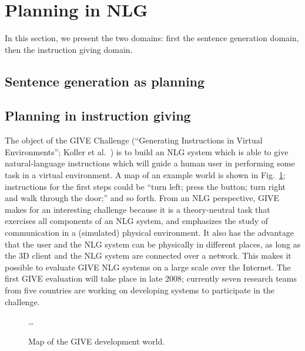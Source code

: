\section{Planning in NLG} \label{sec:domains}

In this section, we present the two domains: first the sentence
generation domain, then the instruction giving domain.


\subsection{Sentence generation as planning}






\subsection{Planning in instruction giving}

The object of the GIVE Challenge (``Generating Instructions in Virtual
Environments''; Koller et al.\
\citeyear{alexander07:_shared_task_propos}) is to build an NLG system
which is able to give natural-language instructions which will guide a
human user in performing some task in a virtual environment.  A map of
an example world is shown in Fig.~\ref{fig:give-development-world};
instructions for the first steps could be ``turn left; press the
button; turn right and walk through the door;'' and so forth.  From an
NLG perspective, GIVE makes for an interesting challenge because it is
a theory-neutral task that exercises all components of an NLG system,
and emphasizes the study of communication in a (simulated) physical
environment.  It also has the advantage that the user and the NLG
system can be physically in different places, as long as the 3D client
and the NLG system are connected over a network.  This makes it
possible to evaluate GIVE NLG systems on a large scale over the
Internet.  The first GIVE evaluation will take place in late 2008;
currently seven research teams from five countries are working on
developing systems to participate in the challenge.

\begin{figure}
\centering
\ldots 
\caption{Map of the GIVE development world.}
  \label{fig:give-development-world}
\end{figure}



